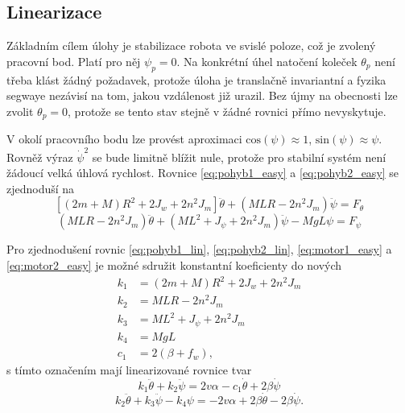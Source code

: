 \documentclass[conference]{IEEEtran}
\begin{document}
\subsection{Linearizace}
\label{sec:linearizace}

Základním cílem úlohy je stabilizace robota ve svislé poloze, což je zvolený pracovní bod.
Platí pro něj $\psi_p = 0$. Na konkrétní úhel natočení koleček $\theta_p$ není třeba klást žádný požadavek,
protože úloha je translačně invariantní a fyzika segwaye nezávisí na tom, jakou vzdálenost již urazil.
Bez újmy na obecnosti lze zvolit $\theta_p = 0$, protože se tento stav stejně v žádné rovnici přímo nevyskytuje.

V okolí pracovního bodu lze provést aproximaci $\text{cos}(\psi) \approx 1$, $\text{sin}(\psi) \approx \psi$. Rovněž výraz $\dot{\psi}^2$ se bude limitně blížit nule,
protože pro stabilní systém není žádoucí velká úhlová rychlost. Rovnice \eqref{eq:pohyb1_easy} a \eqref{eq:pohyb2_easy} se zjednoduší na
\begin{equation}
    \left[(2m + M) R^2 + 2 J_w + 2n^2 J_m\right] \ddot{\theta} + (MLR - 2n^2 J_m) \ddot{\psi} = F_\theta
    \label{eq:pohyb1_lin}
\end{equation}
\begin{equation}
    (MLR - 2n^2 J_m) \ddot{\theta} + (ML^2 + J_\psi + 2n^2 J_m) \ddot{\psi} - MgL \psi = F_\psi
    \label{eq:pohyb2_lin}
\end{equation}

Pro zjednodušení rovnic \eqref{eq:pohyb1_lin}, \eqref{eq:pohyb2_lin}, \eqref{eq:motor1_easy} a \eqref{eq:motor2_easy}
je možné sdružit konstantní koeficienty do nových 
\begin{equation}
    \begin{split}
        k_1 &= (2m + M) R^2 + 2 J_w + 2n^2 J_m \\
        k_2 &= MLR - 2n^2 J_m \\
        k_3 &= ML^2 + J_\psi + 2n^2 J_m \\
        k_4 &= MgL \\
        c_1 &= 2(\beta + f_w),
    \end{split}
\end{equation}
s tímto označením mají linearizované rovnice tvar
\begin{equation}
    k_1 \ddot{\theta} + k_2 \ddot{\psi} = 2v \alpha - c_1 \dot{\theta} + 2\beta\dot{\psi}
    \label{eq:pohyb1_lin_simple}
\end{equation}
\begin{equation}
    k_2 \ddot{\theta} + k_3 \ddot{\psi} - k_4 \psi = - 2v \alpha + 2\beta \dot{\theta} - 2\beta \dot{\psi}.
    \label{eq:pohyb2_lin_simple}
\end{equation}
\end{document}
